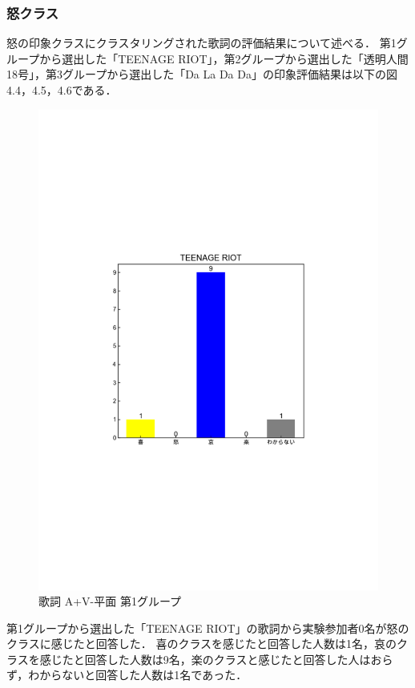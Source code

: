 \subsubsection{怒クラス}
怒の印象クラスにクラスタリングされた歌詞の評価結果について述べる．
第1グループから選出した「TEENAGE RIOT」，第2グループから選出した「透明人間18号」，第3グループから選出した「Da La Da Da」の印象評価結果は以下の図4.4，4.5，4.6である．
\begin{figure}[H]
    \centering
    \includegraphics[width=14cm]{4316.pdf}
    \vspace{-1mm}
    \caption{歌詞 A+V-平面 第1グループ}
    \label{fig:mms}
    \vspace{5mm}
\end{figure}
第1グループから選出した「TEENAGE RIOT」の歌詞から実験参加者0名が怒のクラスに感じたと回答した．
喜のクラスを感じたと回答した人数は1名，哀のクラスを感じたと回答した人数は9名，楽のクラスと感じたと回答した人はおらず，わからないと回答した人数は1名であった．
